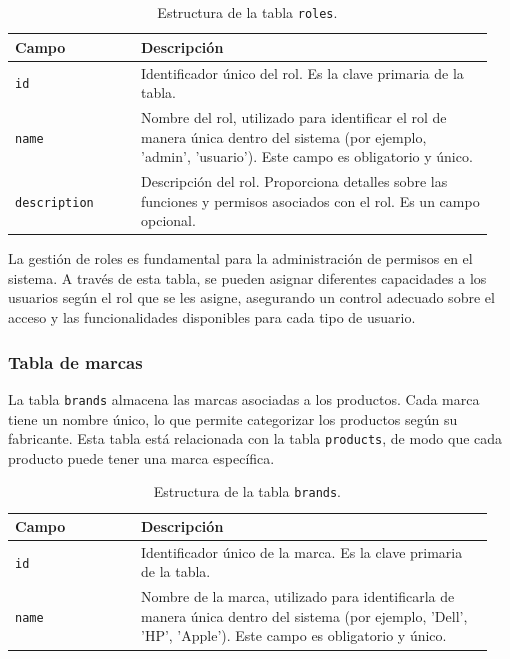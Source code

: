 \begin{table}[H]
  \centering
  \begin{tabular}{|p{0.25\linewidth}|p{0.7\linewidth}|}
    \hline
    \textbf{Campo} & \textbf{Descripción} \\
    \hline
    \texttt{id} & Identificador único del rol. Es la clave primaria de la tabla. \\
    \hline
    \texttt{name} & Nombre del rol, utilizado para identificar el rol de manera única dentro del sistema (por ejemplo, 'admin', 'usuario'). Este campo es obligatorio y único. \\
    \hline
    \texttt{description} & Descripción del rol. Proporciona detalles sobre las funciones y permisos asociados con el rol. Es un campo opcional. \\
    \hline
  \end{tabular}
  \caption{Estructura de la tabla \texttt{roles}.}
  \label{tab:tabla_roles}
\end{table}

La gestión de roles es fundamental para la administración de permisos en el sistema. A través de esta tabla, se pueden asignar diferentes capacidades a los usuarios según el rol que se les asigne, asegurando un control adecuado sobre el acceso y las funcionalidades disponibles para cada tipo de usuario.

\subsubsection*{Tabla de marcas}

La tabla \texttt{brands} almacena las marcas asociadas a los productos. Cada marca tiene un nombre único, lo que permite categorizar los productos según su fabricante. Esta tabla está relacionada con la tabla \texttt{products}, de modo que cada producto puede tener una marca específica.

\begin{table}[H]
	\centering
	\begin{tabular}{|p{0.25\linewidth}|p{0.7\linewidth}|}
		\hline
		\textbf{Campo} & \textbf{Descripción} \\
		\hline
		\texttt{id} & Identificador único de la marca. Es la clave primaria de la tabla. \\
		\hline
		\texttt{name} & Nombre de la marca, utilizado para identificarla de manera única dentro del sistema (por ejemplo, 'Dell', 'HP', 'Apple'). Este campo es obligatorio y único. \\
		\hline
	\end{tabular}
	\caption{Estructura de la tabla \texttt{brands}.}
	\label{tab:tabla_brands}
\end{table}

